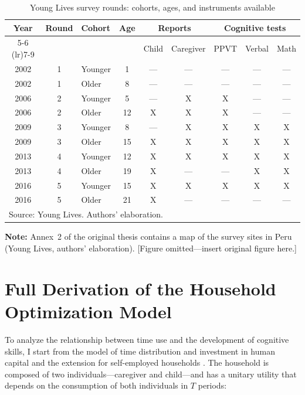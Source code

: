 \documentclass[12pt]{article}
\begin{document}
\begin{table}[ht]
\centering
\caption{Young Lives survey rounds: cohorts, ages, and instruments available}
\label{tab:younglives}
\begin{tabular}{cclcccccc}
\toprule
\textbf{Year} & \textbf{Round} & \textbf{Cohort} & \textbf{Age}
  & \multicolumn{2}{c}{\textbf{Reports}}
  & \multicolumn{3}{c}{\textbf{Cognitive tests}} \\
\cmidrule(lr){5-6} \cmidrule(lr){7-9}
 & & & & Child & Caregiver & PPVT & Verbal & Math \\
\midrule
2002 & 1 & Younger & 1  & --- & --- & --- & --- & --- \\
2002 & 1 & Older   & 8  & --- & --- & --- & --- & --- \\
2006 & 2 & Younger & 5  & --- & X   & X   & --- & --- \\
2006 & 2 & Older   & 12 & X   & X   & X   & --- & --- \\
2009 & 3 & Younger & 8  & --- & X   & X   & X   & X   \\
2009 & 3 & Older   & 15 & X   & X   & X   & X   & X   \\
2013 & 4 & Younger & 12 & X   & X   & X   & X   & X   \\
2013 & 4 & Older   & 19 & X   & --- & --- & X   & X   \\
2016 & 5 & Younger & 15 & X   & X   & X   & X   & X   \\
2016 & 5 & Older   & 21 & X   & --- & --- & --- & --- \\
\bottomrule
\multicolumn{9}{l}{\footnotesize Source: Young Lives. Authors' elaboration.}
\end{tabular}
\end{table}

\noindent
\textbf{Note:} Annex~2 of the original thesis contains a map of the survey
sites in Peru (Young Lives, authors' elaboration). [Figure omitted---insert
original figure here.]

\section{Full Derivation of the Household Optimization Model}
\label{app:model}

To analyze the relationship between time use and the development of cognitive
skills, I start from the model of time distribution and investment in human
capital \citep{becker1964} and the extension for self-employed households
\citep{gronau1977}. The household is composed of two individuals---caregiver
and child---and has a unitary utility that depends on the consumption of both
individuals in $T$ periods:
\end{document}
